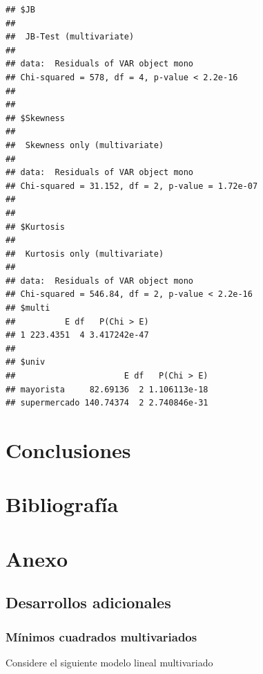 \documentclass[12pt, twoside]{book}\usepackage[]{graphicx}\usepackage[]{color}
\makeatletter
\newenvironment{kframe}{%
 \def\at@end@of@kframe{}%
 \ifinner\ifhmode%
  \def\at@end@of@kframe{\end{minipage}}%
  \begin{minipage}{\columnwidth}%
 \fi\fi%
 \def\FrameCommand##1{\hskip\@totalleftmargin \hskip-\fboxsep
 \colorbox{shadecolor}{##1}\hskip-\fboxsep
     \hskip-\linewidth \hskip-\@totalleftmargin \hskip\columnwidth}%
 \MakeFramed {\advance\hsize-\width
   \@totalleftmargin\z@ \linewidth\hsize
   \@setminipage}}%
 {\par\unskip\endMakeFramed%
 \at@end@of@kframe}
\newenvironment{knitrout}{}{} %
\numberwithin{equation}{section}
\numberwithin{theorem}{section}
\numberwithin{teorema}{section}
\numberwithin{defi}{section}
\numberwithin{prop}{section}
\numberwithin{defi}{section}
\theoremstyle{plain}
\makeatother
\begin{document}
\begin{knitrout}
\color{fgcolor}\begin{kframe}
\begin{verbatim}
## $JB
## 
## 	JB-Test (multivariate)
## 
## data:  Residuals of VAR object mono
## Chi-squared = 578, df = 4, p-value < 2.2e-16
## 
## 
## $Skewness
## 
## 	Skewness only (multivariate)
## 
## data:  Residuals of VAR object mono
## Chi-squared = 31.152, df = 2, p-value = 1.72e-07
## 
## 
## $Kurtosis
## 
## 	Kurtosis only (multivariate)
## 
## data:  Residuals of VAR object mono
## Chi-squared = 546.84, df = 2, p-value < 2.2e-16
## $multi
##          E df   P(Chi > E)
## 1 223.4351  4 3.417242e-47
## 
## $univ
##                      E df   P(Chi > E)
## mayorista     82.69136  2 1.106113e-18
## supermercado 140.74374  2 2.740846e-31
\end{verbatim}
\end{kframe}
\end{knitrout}

\nocite{greene2003}

\chapter{Conclusiones}
\chapter{Bibliografía}

\printbibliography

\chapter{Anexo}
\begingroup
\renewcommand\thesection{A}
\titleformat{\section}[display]
{\normalfont\huge\bfseries}{}{20pt}{\huge}

\section{Desarrollos adicionales}
\subsection{Mínimos cuadrados multivariados}

Considere el siguiente modelo lineal multivariado 
\end{document}
